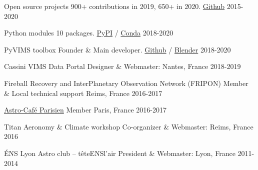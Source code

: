 
\begin{cventries}

  \cventry
    {Open source projects}
    {900+ contributions in 2019, 650+ in 2020.}
    {\href{https://github.com/seignovert/}{Github}}
    {2015-2020}
    {}

  \cventry
    {Python modules}
    {10 packages.}
    {\href{https://pypi.org/user/seignovert/}{PyPI} /
     \href{https://anaconda.org/seignovert}{Conda}}
    {2018-2020}
    {}

  \cventry
    {PyVIMS toolbox}
    {Founder \& Main developer.}
    {\href{https://github.com/seignovert/pyvims/tree/dev}{Github} /
     \href{https://mybinder.org/v2/gh/seignovert/pyvims/dev?filepath=notebooks/pyvims.ipynb}{Blender}}
    {2018-2020}
    {}

  \cventry
    {Cassini VIMS Data Portal}
    {Designer \& Webmaster: }
    {Nantes, France}
    {2018-2019}
    {}

    \cventry
    {Fireball Recovery and InterPlanetary Observation Network (FRIPON)}
    {Member \& Local technical support}
    {Reims, France}
    {2016-2017}
    {}

  \cventry
    {\href{https://cafeastroparisien.wordpress.com/}{Astro-Café Parisien}}
    {Member}
    {Paris, France}
    {2016-2017}
    {}

  \cventry
    {Titan Aeronomy \& Climate workshop}
    {Co-organizer \& Webmaster: }
    {Reims, France}
    {2016}
    {}

  \cventry
    {ÉNS Lyon Astro club -- têteENSl'air}
    {President \& Webmaster: }
    {Lyon, France}
    {2011-2014}
    {}

\end{cventries}
